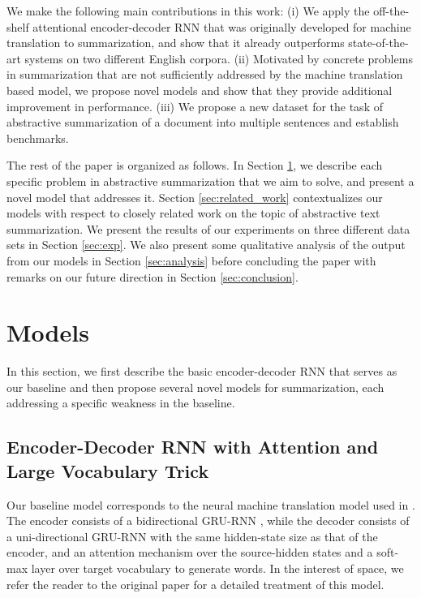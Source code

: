 We make the following main contributions in this work: (i) We apply the off-the-shelf attentional encoder-decoder RNN that was originally developed for machine translation to summarization, and show that it already outperforms state-of-the-art systems on two different English corpora. (ii) Motivated by concrete problems in summarization that are not sufficiently addressed by the machine translation based model, we propose novel models and show that they provide additional improvement in performance. (iii) We propose a new dataset for the task of abstractive summarization of a document into multiple sentences and establish benchmarks.  

The rest of the paper is organized as follows. In Section \ref{sec:models}, we describe each specific problem in abstractive summarization that we aim to solve, and present a novel model that addresses it. Section \ref{sec:related_work} contextualizes our models with respect to closely related work on the topic of abstractive text summarization. We present the results of our experiments on three different data sets in Section \ref{sec:exp}. We also present some qualitative analysis of the output from our models in Section \ref{sec:analysis} before concluding the paper with remarks on our future direction in Section \ref{sec:conclusion}.

\section{Models}\label{sec:models}
In this section, we first describe the basic encoder-decoder RNN that serves as our baseline and then propose several novel models for summarization, each addressing a specific weakness in the baseline.

\subsection{Encoder-Decoder RNN with Attention and Large Vocabulary Trick}\label{sec:enc_dec}
Our baseline model corresponds to the neural machine translation model used in . The encoder consists of a bidirectional GRU-RNN \cite{gru_rnn}, while the decoder consists of a uni-directional GRU-RNN with the same hidden-state size as that of the encoder, and an attention mechanism over the source-hidden states and a soft-max layer over target vocabulary to generate words. In the interest of space, we refer the reader to the original paper for a detailed treatment of this model.

